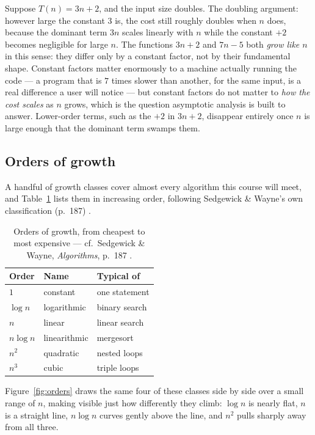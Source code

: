 \documentclass[11pt]{article}
\begin{document}
Suppose $T(n) = 3n + 2$, and the input size doubles. The doubling argument:
however large the constant $3$ is, the cost still roughly doubles when $n$
does, because the dominant term $3n$ scales linearly with $n$ while the
constant $+2$ becomes negligible for large $n$. The functions $3n + 2$ and
$7n - 5$ both \emph{grow like $n$} in this sense: they differ only by a
constant factor, not by their fundamental shape. Constant factors matter
enormously to a machine actually running the code --- a program that is
$7$ times slower than another, for the same input, is a real difference a
user will notice --- but constant factors do not matter to \emph{how the
cost scales} as $n$ grows, which is the question asymptotic analysis is
built to answer. Lower-order terms, such as the $+2$ in $3n+2$, disappear
entirely once $n$ is large enough that the dominant term swamps them.

\subsection{Orders of growth}

A handful of growth classes cover almost every algorithm this course will
meet, and Table~\ref{tab:orders} lists them in increasing order, following
Sedgewick \& Wayne's own classification (p.~187) \cite{Sedgewick2011_algorithms}.

\begin{table}[h]
\centering
\begin{tabular}{lll}
\toprule
\textbf{Order} & \textbf{Name} & \textbf{Typical of} \\
\midrule
$1$        & constant     & one statement \\
$\log n$   & logarithmic  & binary search \\
$n$        & linear       & linear search \\
$n \log n$ & linearithmic & mergesort \\
$n^2$      & quadratic    & nested loops \\
$n^3$      & cubic        & triple loops \\
\bottomrule
\end{tabular}
\caption{Orders of growth, from cheapest to most expensive --- cf.\ Sedgewick
\& Wayne, \textit{Algorithms}, p.~187 \cite{Sedgewick2011_algorithms}.}
\label{tab:orders}
\end{table}

Figure~\ref{fig:orders} draws the same four of these classes side by side
over a small range of $n$, making visible just how differently they climb:
$\log n$ is nearly flat, $n$ is a straight line, $n \log n$ curves gently
above the line, and $n^2$ pulls sharply away from all three.
\end{document}
